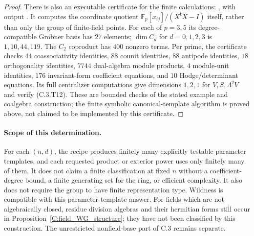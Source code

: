 \begin{proof}
There is also an executable certificate for the finite calculations:
, with output
. It computes the
coordinate quotient $\mathbb F_p[x_{ij}]/(X^{\mathsf t}X-I)$ itself,
rather than only the group of finite-field points. For each of
$p=3,5$ its degree-compatible Gr\"obner basis has $27$ elements;
$\dim C_d$ for $d=0,1,2,3$ is $1,10,44,119$. The $C_2$
coproduct has $400$ nonzero terms. Per prime, the certificate checks
$44$ coassociativity identities, $88$ counit identities, $88$
antipode identities, $18$ orthogonality identities, $7744$ dual-algebra
module products, $4$ module-unit identities, $176$ invariant-form
coefficient equations, and $10$ Hodge/determinant equations. Its
full centralizer computations give dimensions $1,2,1$ for
$V,S,\Lambda^2 V$ and verify (C.3.T12). These are bounded checks of
the stated example and coalgebra construction; the finite symbolic
canonical-template algorithm is proved above, not claimed to be
implemented by this certificate.
\end{proof}

\paragraph{Scope of this determination.}
For each $(n,d)$, the recipe produces finitely many explicitly testable
parameter templates, and each requested product or exterior power uses
only finitely many of them. It does not claim a finite classification
at fixed $n$ without a coefficient-degree bound, a finite generating
set for the ring, or efficient complexity. It also does not require
the group to have finite representation type. Wildness is compatible
with this parameter-template answer. For fields which are not
algebraically closed, residue division algebras and their hermitian
forms still occur in Proposition~\ref{C:field_WG_structure}; they have
not been classified by this construction. The unrestricted
nonfield-base part of C.3 remains separate.

